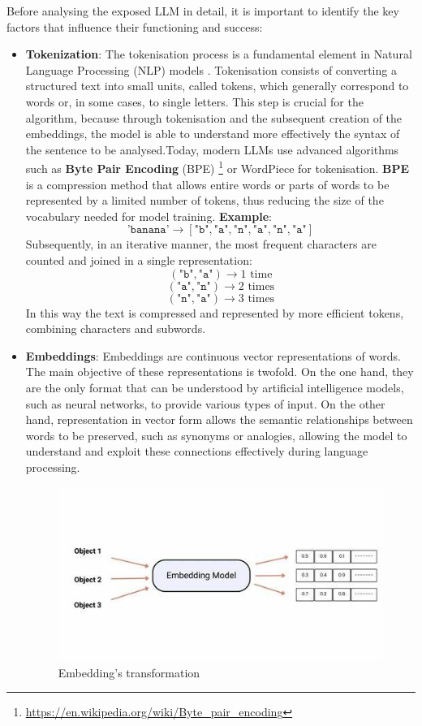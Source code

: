Before analysing the exposed LLM in detail, it is important to identify the key factors that influence their functioning and success: \\
\begin{itemize}
    \item \textbf{Tokenization}: The tokenisation process is a fundamental element in Natural Language Processing (NLP) models \cite{NLP}. Tokenisation consists of converting a structured text into small units, called tokens, which generally correspond to words or, in some cases, to single letters. This step is crucial for the algorithm, because through tokenisation and the subsequent creation of the embeddings, the model is able to understand more effectively the syntax of the sentence to be analysed.Today, modern LLMs use advanced algorithms such as \textbf{Byte Pair Encoding }(BPE) \footnote{\url{https://en.wikipedia.org/wiki/Byte_pair_encoding}} or WordPiece \cite{WordPiece} for tokenisation. \textbf{BPE} is a compression method that allows entire words or parts of words to be represented by a limited number of tokens, thus reducing the size of the vocabulary needed for model training.
    \textbf{Example}: \[
\texttt{'banana'} \rightarrow [\texttt{"b"}, \texttt{"a"}, \texttt{"n"}, \texttt{"a"}, \texttt{"n"}, \texttt{"a"}]
\]
Subsequently, in an iterative manner, the most frequent characters are counted and joined in a single representation:\\
\[
(\texttt{"b"}, \texttt{"a"}) \rightarrow 1 \text{ time}
\]
\[
(\texttt{"a"}, \texttt{"n"}) \rightarrow 2 \text{ times}
\]
\[
(\texttt{"n"}, \texttt{"a"}) \rightarrow 3 \text{ times}
\]
In this way the text is compressed and represented by more efficient tokens, combining characters and subwords.
\item \textbf{Embeddings}: Embeddings are continuous vector representations of words. The main objective of these representations is twofold. On the one hand, they are the only format that can be understood by artificial intelligence models, such as neural networks, to provide various types of input. On the other hand, representation in vector form allows the semantic relationships between words to be preserved, such as synonyms or analogies, allowing the model to understand and exploit these connections effectively during language processing.

\begin{figure}[h]
    \centering
    \includegraphics[width=0.7\linewidth]{Figures/Embeddings.png}
    \caption{Embedding's transformation}
    \label{fig:graph}
\end{figure}


\end{itemize}

